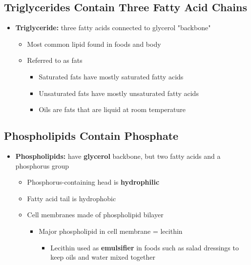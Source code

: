 \documentclass[12pt]{article}
\begin{document}
        \subsection{Triglycerides Contain Three Fatty Acid Chains}
            \begin{itemize}
                \item \textbf{Triglyceride:} three fatty acids connected to glycerol "backbone"
                    \begin{itemize}
                        \item Most common lipid found in foods and body
                        \item Referred to as fats
                            \begin{itemize}
                                \item Saturated fats have mostly saturated fatty acids
                                \item Unsaturated fats have mostly unsaturated fatty acids
                                \item Oils are fats that are liquid at room temperature
                            \end{itemize}
                    \end{itemize}
            \end{itemize}

        \subsection{Phospholipids Contain Phosphate}
            \begin{itemize}
                \item \textbf{Phospholipids:} have \textbf{glycerol} backbone, but two fatty acids and a phosphorus group
                    \begin{itemize}
                        \item Phosphorus-containing head is \textbf{hydrophilic}
                        \item Fatty acid tail is hydrophobic
                        \item Cell membranes made of phospholipid bilayer
                            \begin{itemize}
                                \item Major phospholipid in cell membrane = lecithin
                                    \begin{itemize}
                                        \item Lecithin used as \textbf{emulsifier} in foods such as salad dressings to keep oils and water mixed together
                                    \end{itemize}
                            \end{itemize}
                    \end{itemize}
            \end{itemize}
\end{document}
